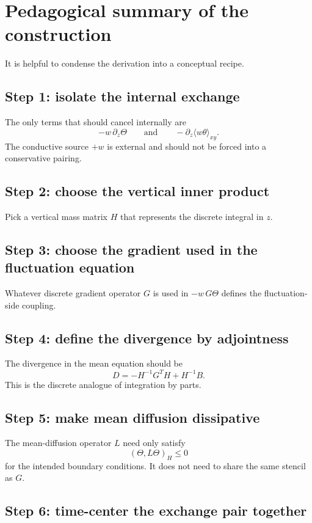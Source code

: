 \documentclass[11pt]{article}
\begin{document}
\section{Pedagogical summary of the construction}

It is helpful to condense the derivation into a conceptual recipe.

\subsection*{Step 1: isolate the internal exchange}

The only terms that should cancel internally are
\[
-w\,\partial_z\Theta
\qquad\text{and}\qquad
-\partial_z\langle w\theta\rangle_{xy}.
\]
The conductive source $+w$ is external and should not be forced into a conservative pairing.

\subsection*{Step 2: choose the vertical inner product}

Pick a vertical mass matrix $H$ that represents the discrete integral in $z$.

\subsection*{Step 3: choose the gradient used in the fluctuation equation}

Whatever discrete gradient operator $G$ is used in $-w\,G\Theta$ defines the fluctuation-side coupling.

\subsection*{Step 4: define the divergence by adjointness}

The divergence in the mean equation should be
\[
D = -H^{-1}G^T H + H^{-1}B.
\]
This is the discrete analogue of integration by parts.

\subsection*{Step 5: make mean diffusion dissipative}

The mean-diffusion operator $L$ need only satisfy
\[
(\Theta,L\Theta)_H \le 0
\]
for the intended boundary conditions. It does not need to share the same stencil as $G$.

\subsection*{Step 6: time-center the exchange pair together}
\end{document}
